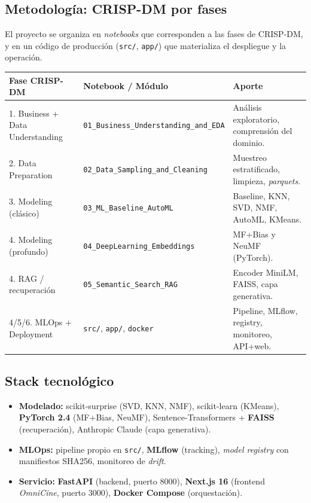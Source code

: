 \documentclass[11pt,a4paper]{article}
\newcommand{\code}[1]{\textcolor{omnidark}{\texttt{#1}}}
\begin{document}
\subsection{Metodología: CRISP-DM por fases}
El proyecto se organiza en \textit{notebooks} que corresponden a las fases de CRISP-DM, y en un código de producción (\code{src/}, \code{app/}) que materializa el despliegue y la operación.

\begin{center}
\small
\begin{tabularx}{\textwidth}{@{}l l X@{}}
\toprule
\textbf{Fase CRISP-DM} & \textbf{Notebook / Módulo} & \textbf{Aporte} \\
\midrule
1. Business + Data Understanding & \code{01\_Business\_Understanding\_and\_EDA} & Análisis exploratorio, comprensión del dominio. \\
2. Data Preparation & \code{02\_Data\_Sampling\_and\_Cleaning} & Muestreo estratificado, limpieza, \textit{parquets}. \\
3. Modeling (clásico) & \code{03\_ML\_Baseline\_AutoML} & Baseline, KNN, SVD, NMF, AutoML, KMeans. \\
4. Modeling (profundo) & \code{04\_DeepLearning\_Embeddings} & MF+Bias y NeuMF (PyTorch). \\
4. RAG / recuperación & \code{05\_Semantic\_Search\_RAG} & Encoder MiniLM, FAISS, capa generativa. \\
4/5/6. MLOps + Deployment & \code{src/}, \code{app/}, \code{docker} & Pipeline, MLflow, registry, monitoreo, API+web. \\
\bottomrule
\end{tabularx}
\end{center}

\subsection{Stack tecnológico}
\begin{itemize}
\item \textbf{Modelado:} scikit-surprise (SVD, KNN, NMF), scikit-learn (KMeans), \textbf{PyTorch 2.4} (MF+Bias, NeuMF), Sentence-Transformers + \textbf{FAISS} (recuperación), Anthropic Claude (capa generativa).
\item \textbf{MLOps:} pipeline propio en \code{src/}, \textbf{MLflow} (tracking), \textit{model registry} con manifiestos SHA256, monitoreo de \textit{drift}.
\item \textbf{Servicio:} \textbf{FastAPI} (backend, puerto 8000), \textbf{Next.js 16} (frontend \textit{OmniCine}, puerto 3000), \textbf{Docker Compose} (orquestación).
\end{itemize}
\end{document}
